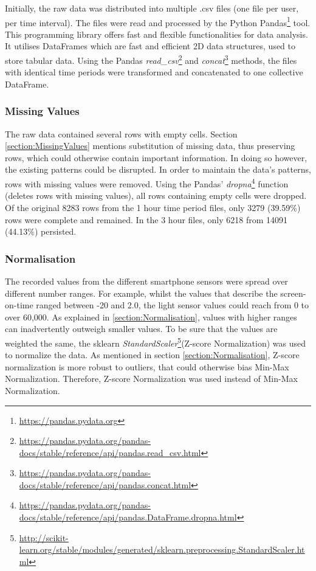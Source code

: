 Initially, the raw data was distributed into multiple .csv files (one file per user, per time interval). The files were read and processed by the Python Pandas\footnote{\url{https://pandas.pydata.org}} tool. This programming library offers fast and flexible functionalities for data analysis. It utilises DataFrames which are fast and efficient 2D data structures, used to store tabular data. Using the Pandas \textit{read\_csv}\footnote{\url{https://pandas.pydata.org/pandas-docs/stable/reference/api/pandas.read_csv.html}} and \textit{concat}\footnote{\url{https://pandas.pydata.org/pandas-docs/stable/reference/api/pandas.concat.html}} methods, the files with identical time periods were transformed and concatenated to one collective DataFrame. 


\subsubsection{Missing Values}
The raw data contained several rows with empty cells. Section \ref{section:MissingValues} mentions substitution of missing data, thus preserving rows, which could otherwise contain important information. In doing so however, the existing patterns could be disrupted. In order to maintain the data's patterns, rows with missing values were removed. Using the Pandas' \textit{dropna}\footnote{\url{https://pandas.pydata.org/pandas-docs/stable/reference/api/pandas.DataFrame.dropna.html}} function (deletes rows with missing values), all rows containing empty cells were dropped. Of the original 8283 rows from the 1 hour time period files, only 3279 (39.59\%) rows were complete and remained. In the 3 hour files, only 6218 from 14091 (44.13\%) persisted.

\subsubsection{Normalisation}
The recorded values from the different smartphone sensors were spread over different number ranges. For example, whilst the values that describe the screen-on-time ranged between -20 and 2.0, the light sensor values could reach from 0 to over 60,000. As explained in \ref{section:Normalisation}, values with higher ranges can inadvertently outweigh smaller values. To be sure that the values are weighted the same, the sklearn \textit{StandardScaler}\footnote{\url{http://scikit-learn.org/stable/modules/generated/sklearn.preprocessing.StandardScaler.html}}(Z-score Normalization) was used to normalize the data. As mentioned in section \ref{section:Normalisation}, Z-score normalization is more robust to outliers, that could otherwise bias Min-Max Normalization. Therefore, Z-score Normalization was used instead of Min-Max Normalization.



